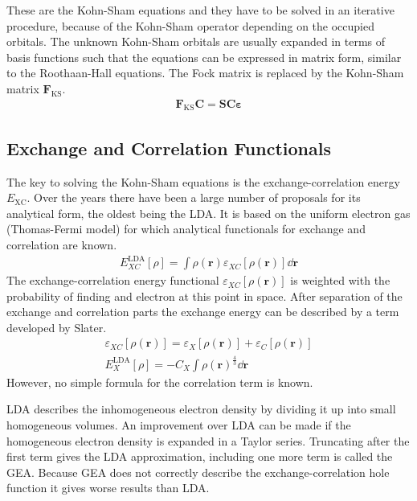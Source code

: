 %
These are the Kohn-Sham equations and they have to be solved in an iterative
procedure, because of the Kohn-Sham operator depending on the occupied
orbitals.  The unknown Kohn-Sham orbitals are usually expanded in terms of
basis functions such that the equations can be expressed in matrix form,
similar to the Roothaan-Hall equations. The Fock matrix is replaced by the
Kohn-Sham matrix $\mathbf{F}_\text{KS}$.
%
\begin{align}
    \mathbf{F}_\text{KS}\mathbf{C} = \mathbf{SC\varepsilon}
\end{align}
%
\subsection{Exchange and Correlation Functionals}
\label{sec:exchangecorrelationfunctionals}

The key to solving the Kohn-Sham equations is the exchange-correlation energy
$E_\text{XC}$. Over the years there have been a large number of proposals for its analytical form,
the oldest being the \ac{LDA}. It is based on the uniform electron gas (Thomas-Fermi model) for
which analytical functionals for exchange and correlation are known.
%
\begin{align}
    E_{XC}^\text{LDA}\left[\rho\right]=\int\rho(\mathbf{r})\varepsilon_{XC}\left[\rho(\mathbf{r})\right]\dd\mathbf{r}
\end{align}
%
The exchange-correlation energy functional $\varepsilon_{XC}\left[\rho(\mathbf{r})\right]$
is weighted with the probability of finding and electron at this point in
space. After separation of the exchange and correlation parts the exchange
energy can be described by a term developed by Slater.
%
\begin{align}
	\varepsilon_{XC}\left[\rho(\mathbf{r})\right] = \varepsilon_{X}\left[\rho(\mathbf{r})\right] + \varepsilon_{C}\left[\rho(\mathbf{r})\right]\\
	E_{X}^\text{LDA}\left[\rho\right] = -C_X\int\rho(\mathbf{r})^{\frac{4}{3}}\dd\mathbf{r}
\end{align}
%
However, no simple formula for the correlation term is known.

\ac{LDA} describes the inhomogeneous electron density by dividing it up into
small homogeneous volumes. An improvement over \ac{LDA} can be made if the
homogeneous electron density is expanded in a Taylor series. Truncating after the
first term gives the \ac{LDA} approximation, including one more term is called
the \ac{GEA}. Because \ac{GEA} does not correctly describe the
exchange-correlation hole function it gives worse results than \ac{LDA}.

